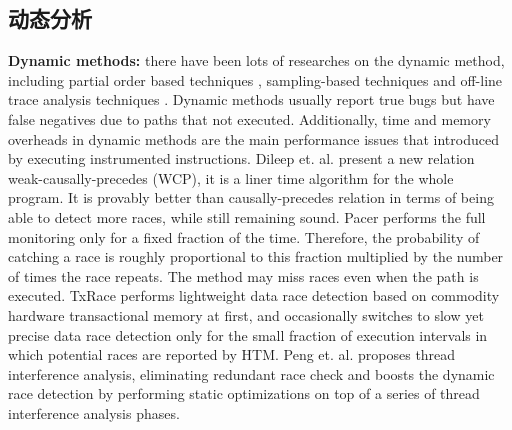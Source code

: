 \subsection{动态分析}

\textbf{Dynamic methods:} there have been lots of researches on the dynamic method, including partial order based techniques \cite{kini2017dynamic}, sampling-based techniques \cite{marino2009literace, bond2010pacer} and off-line trace analysis techniques \cite{huang2013clap, machado2015concurrency, huang2016precise, zhang2017prorace}. 
Dynamic methods usually report true bugs but have false negatives due to paths that not executed. 
Additionally, time and memory overheads in dynamic methods are the main performance issues that introduced by executing instrumented instructions.
Dileep et. al. \cite{kini2017dynamic} present a new relation weak-causally-precedes (WCP), it is a liner time algorithm for the whole program. 
It is provably better than causally-precedes relation in terms of being able to detect more races, while still remaining sound. 
Pacer \cite{bond2010pacer} performs the full monitoring only for a fixed fraction of the time. 
Therefore, the probability of catching a race is roughly proportional to this fraction multiplied by the number of times the race repeats. 
The method may miss races even when the path is executed.
TxRace \cite{zhang2016txrace} performs lightweight data race detection based on commodity hardware transactional memory at first, and occasionally switches to slow yet precise data race detection only for the small fraction of execution intervals in which potential races are reported by HTM. 
Peng et. al. \cite{di2016accelerating} proposes thread interference analysis, 
eliminating redundant race check and boosts the dynamic race detection by performing static optimizations on top of a series of thread interference analysis phases.

